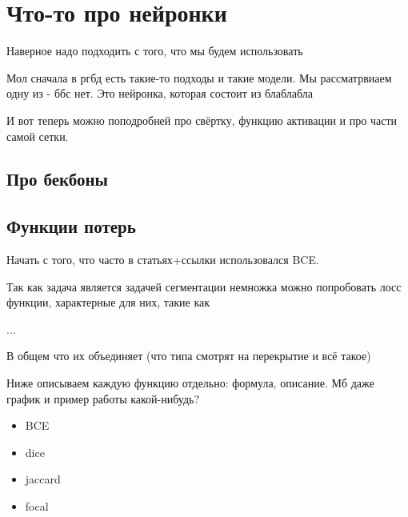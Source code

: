 \section{Что-то про нейронки}

Наверное надо подходить с того, что мы будем использовать 

Мол сначала в ргбд есть такие-то подходы и такие модели. Мы рассматрвиаем одну из - ббс нет. Это нейронка, которая состоит из блаблабла

И вот теперь можно поподробней про свёртку, функцию активации и про части самой сетки.

\subsection{Про бекбоны}

\subsection{Функции потерь}

Начать с того, что часто в статьях+ссылки использовался BCE.

Так как задача является задачей сегментации немножка можно попробовать лосс функции, характерные для них, такие как

...

В общем что их объединяет (что типа смотрят на перекрытие и всё такое)

Ниже описываем каждую функцию отдельно: формула, описание. Мб даже график и пример работы какой-нибудь? 

\begin{itemize}
    \item BCE
    \item dice
    \item jaccard
    \item focal
\end{itemize}